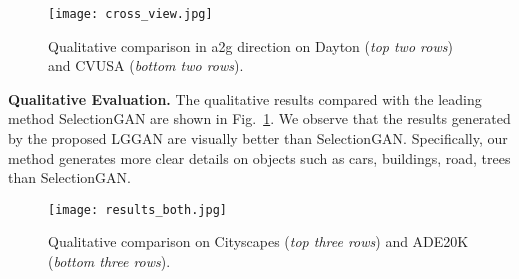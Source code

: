 \documentclass[10pt,twocolumn,letterpaper]{article}
\begin{document}
\begin{figure}[!t] \small
	\centering
	\texttt{[image: cross\_view.jpg]}
	\caption{Qualitative comparison in a2g direction on Dayton (\textit{top two rows}) and CVUSA (\textit{bottom two rows}).
	}
	\label{fig:dayton256}
	\vspace{-0.4cm}
\end{figure}


\noindent\textbf{Qualitative Evaluation.}
The qualitative results compared with the leading method SelectionGAN \cite{tang2019multi} are shown in Fig.~\ref{fig:dayton256}.
We observe that the  results generated by the proposed LGGAN are visually better than SelectionGAN.
Specifically, our method generates more clear details on objects such as cars, buildings, road, trees than SelectionGAN.


\begin{figure*}[!t] \small
	\centering
	\texttt{[image: results\_both.jpg]}
	\caption{Qualitative comparison  on Cityscapes (\textit{top three rows}) and ADE20K (\textit{bottom three rows}).
	}
	\label{fig:cityscapes}
	\vspace{-0.3cm}
\end{figure*}
\end{document}
